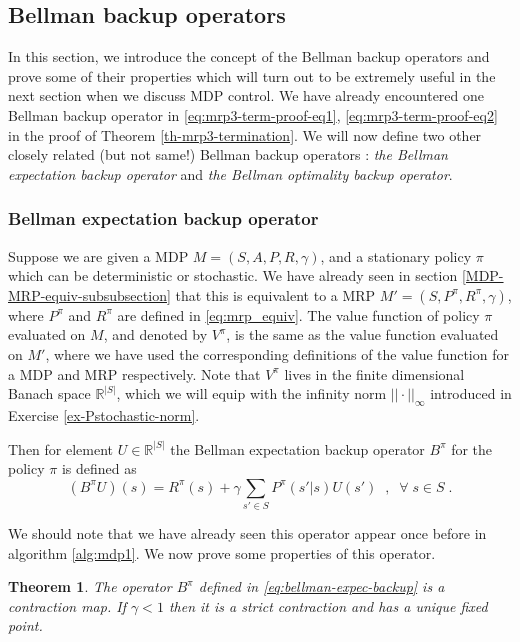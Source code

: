 \documentclass{article}
\newtheorem{theorem}{Theorem}[section]
\theoremstyle{definition}
\theoremstyle{remark}
\begin{document}
\subsection{Bellman backup operators}
In this section, we introduce the concept of the Bellman backup operators and prove some of their properties which will turn out to be extremely useful in the next section when we discuss MDP control. We have already encountered one Bellman backup operator in \eqref{eq:mrp3-term-proof-eq1}, \eqref{eq:mrp3-term-proof-eq2} in the proof of Theorem \ref{th-mrp3-termination}. We will now define two other closely related (but not same!) Bellman backup operators : \textit{the Bellman expectation backup operator} and \textit{the Bellman optimality backup operator}.

\subsubsection{Bellman expectation backup operator}
Suppose we are given a MDP $M=(S,A,P,R,\gamma)$, and a stationary policy $\pi$ which can be deterministic or stochastic. We have already seen in section \ref{MDP-MRP-equiv-subsubsection} that this is equivalent to a MRP $M'=(S,P^{\pi},R^{\pi},\gamma)$, where $P^{\pi}$ and $R^{\pi}$ are defined in \eqref{eq:mrp_equiv}. The value function of policy $\pi$ evaluated on $M$, and denoted by $V^{\pi}$, is the same as the value function evaluated on $M'$, where we have used the corresponding definitions of the value function for a MDP and MRP respectively. Note that $V^{\pi}$ lives in the finite dimensional Banach space $\mathbb{R}^{|S|}$, which we will equip with the infinity norm $||\cdot||_{\infty}$ introduced in Exercise \ref{ex-Pstochastic-norm}.

Then for element $U \in \mathbb{R}^{|S|}$ the Bellman expectation backup operator $B^{\pi}$ for the policy $\pi$ is defined as
\begin{equation}
(B^{\pi}U)(s) = R^{\pi}(s) + \gamma \sum_{s' \in S} P^{\pi}(s'|s)U(s') \;\;, \;\; \forall \; s \in S \;.
\label{eq:bellman-expec-backup}
\end{equation}

We should note that we have already seen this operator appear once before in algorithm \ref{alg:mdp1}. We now prove some properties of this operator.

\begin{theorem}
The operator $B^{\pi}$ defined in \eqref{eq:bellman-expec-backup} is a contraction map. If $\gamma < 1$ then it is a strict contraction and has a unique fixed point.
\label{th-bellman-expec-backup-contraction}
\end{theorem}
\end{document}

